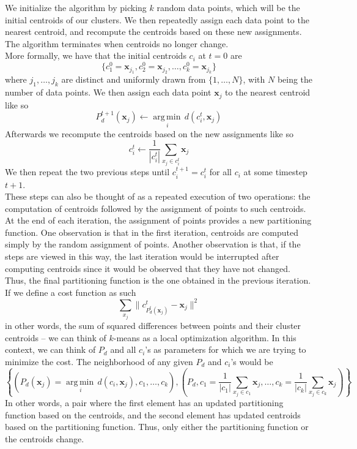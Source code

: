 \documentclass[12pt]{article}
\newcommand{\paren}[1]{\left(#1\right)}
\newcommand{\curly}[1]{\left\{#1\right\}}
\newcommand{\norm}[1]{\lVert#1\rVert}
\newcommand{\argmin}[1]{\underset{#1}{\operatorname{arg\,min\,}}}
\begin{document}
We initialize the algorithm by picking $k$ random data points, which will be the initial centroids of our clusters. We then repeatedly assign each data point to the nearest centroid, and recompute the centroids based on these new assignments. The algorithm terminates when centroids no longer change.
\\\newline
More formally, we have that the initial centroids $c_i$ at $t = 0$ are
\[ \{c_1^0 = \mathbf{x}_{j_1}, c_2^0 = \mathbf{x}_{j_2}, \dots, c_k^0 = \mathbf{x}_{j_k}\} \]
where $j_1, \dots, j_k$ are distinct and uniformly drawn from $\{1, \dots, N\}$, with $N$ being the number of data points. We then assign each data point $\mathbf{x}_j$ to the nearest centroid like so
\[ P_d^{t+1}(\mathbf{x}_j) \leftarrow \argmin{i}d(c_i^t, \mathbf{x}_j) \]
Afterwards we recompute the centroids based on the new assignments like so
\[ c_i^t \leftarrow \frac{1}{|c_i^t|}\sum_{x_j \in c_i^t}\mathbf{x}_j \]
We then repeat the two previous steps until $c_i^{t+1} = c_i^t$ for all $c_i$ at some timestep $t + 1$.
\\\newline
These steps can also be thought of as a repeated execution of two operations: the computation of centroids followed by the assignment of points to such centroids. At the end of each iteration, the assignment of points provides a new partitioning function. One observation is that in the first iteration, centroids are computed simply by the random assignment of points. Another observation is that, if the steps are viewed in this way, the last iteration would be interrupted after computing centroids since it would be observed that they have not changed. Thus, the final partitioning function is the one obtained in the previous iteration.
\\\newline
If we define a cost function as such
\[ \sum_{x_j}\norm{c_{P_d^t(\mathbf{x}_j)}^t - \mathbf{x}_j}^2 \]
in other words, the sum of squared differences between points and their cluster centroids -- we can think of $k$-means as a local optimization algorithm. In this context, we can think of $P_d$ and all $c_i$'s as parameters for which we are trying to minimize the cost. The neighborhood of any given $P_d$ and $c_i$'s would be
\[ \curly{\paren{P_d(\mathbf{x}_j) = \argmin{i}d(c_i, \mathbf{x}_j), c_1, \dots, c_k}, \paren{P_d, c_1 = \frac{1}{|c_1|}\sum_{x_j \in c_1}\mathbf{x}_j, \dots, c_k = \frac{1}{|c_k|}\sum_{x_j \in c_k}\mathbf{x}_j}} \]
In other words, a pair where the first element has an updated partitioning function based on the centroids, and the second element has updated centroids based on the partitioning function. Thus, only either the partitioning function or the centroids change.
\end{document}
